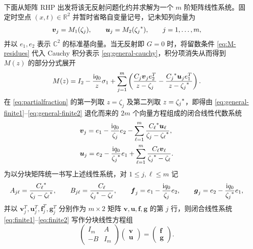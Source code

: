 下面从矩阵 RHP 出发将该无反射问题化约并求解为一个 $m$ 阶矩阵线性系统。固定时空点 $(x,t)\in\mathbb R^2$ 并暂时省略自变量记号，记未知列向量为
\begin{equation*}
\boldsymbol v_j=M_1(\zeta_j),\qquad \boldsymbol u_j=M_2({\zeta_j}^{*}),\qquad j=1,\ldots,m,
\end{equation*}
并以 $e_1,e_2$ 表示 $\mathbb C^2$ 的标准基向量。当无反射即 $G=0$ 时，将留数条件 \eqref{eq:M-residues} 代入 Cauchy 积分表示 \eqref{eq:general-cauchy}，积分项消失从而得到 $M(z)$ 的部分分式展开
\begin{equation}\label{eq:partialfraction}
M(z)=I_2-\dfrac{\mathrm{i} q_0}{z}\sigma_1+\sum\limits_{j=1}^{m}
\left(\dfrac{C_j\boldsymbol v_je_2^T}{z-\zeta_j}
-\dfrac{{C_j}^{*}\boldsymbol u_je_1^T}{z-{\zeta_j}^{*}}\right).
\end{equation}
在 \eqref{eq:partialfraction} 的第一列取 $z=\zeta_j$ 及第二列取 $z={\zeta_j}^{*}$，即得由 \eqref{eq:general-finite1}--\eqref{eq:general-finite2} 退化而来的 $2m$ 个向量方程组成的闭合线性代数系统
\begin{align}
&\boldsymbol v_j=e_1-\dfrac{\mathrm{i} q_0}{\zeta_j}e_2
-\sum\limits_{\ell=1}^{m}\dfrac{{C_\ell}^{*}\boldsymbol u_\ell}{\zeta_j-{\zeta_\ell}^{*}},\label{eq:finite1}\\
&\boldsymbol u_j=e_2-\dfrac{\mathrm{i} q_0}{{\zeta_j}^{*}}e_1
+\sum\limits_{\ell=1}^{m}\dfrac{C_\ell\boldsymbol v_\ell}{{\zeta_j}^{*}-\zeta_\ell}.\label{eq:finite2}
\end{align}
为以分块矩阵统一书写上述线性系统，对 $1\le j,\ell\le m$ 记
\begin{equation*}
A_{j\ell}=\dfrac{{C_\ell}^{*}}{\zeta_j-{\zeta_\ell}^{*}},\qquad
B_{j\ell}=\dfrac{C_\ell}{{\zeta_j}^{*}-\zeta_\ell},\qquad
\boldsymbol f_j=e_1-\dfrac{\mathrm{i} q_0}{\zeta_j}e_2,\qquad
\boldsymbol g_j=e_2-\dfrac{\mathrm{i} q_0}{{\zeta_j}^{*}}e_1,
\end{equation*}
并以 $\boldsymbol v_j^T,\boldsymbol u_j^T,\boldsymbol f_j^T,\boldsymbol g_j^T$ 分别作为 $m\times2$ 矩阵 $\boldsymbol v,\boldsymbol u,\boldsymbol f,\boldsymbol g$ 的第 $j$ 行，则闭合线性系统 \eqref{eq:finite1}--\eqref{eq:finite2} 写作分块线性方程组
\begin{equation}\label{eq:N-block-system}
\begin{pmatrix}I_m&A\\-B&I_m\end{pmatrix}
\begin{pmatrix}\boldsymbol v\\\boldsymbol u\end{pmatrix}
=\begin{pmatrix}\boldsymbol f\\\boldsymbol g\end{pmatrix}.
\end{equation}

